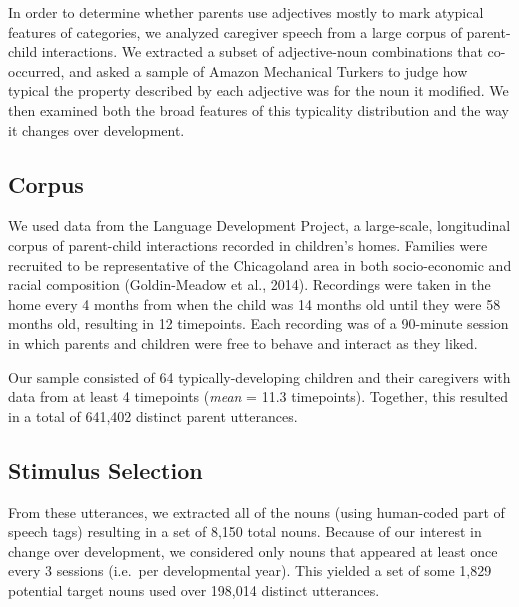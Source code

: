 \documentclass[10pt, letterpaper]{article}
\begin{document}
In order to determine whether parents use adjectives mostly to mark
atypical features of categories, we analyzed caregiver speech from a
large corpus of parent-child interactions. We extracted a subset of
adjective-noun combinations that co-occurred, and asked a sample of
Amazon Mechanical Turkers to judge how typical the property described by
each adjective was for the noun it modified. We then examined both the
broad features of this typicality distribution and the way it changes
over development.

\hypertarget{corpus}{%
\subsection{Corpus}\label{corpus}}

We used data from the Language Development Project, a large-scale,
longitudinal corpus of parent-child interactions recorded in children's
homes. Families were recruited to be representative of the Chicagoland
area in both socio-economic and racial composition (Goldin-Meadow et
al., 2014). Recordings were taken in the home every 4 months from when
the child was 14 months old until they were 58 months old, resulting in
12 timepoints. Each recording was of a 90-minute session in which
parents and children were free to behave and interact as they liked.

Our sample consisted of 64 typically-developing children and their
caregivers with data from at least 4 timepoints (\emph{mean} = 11.3
timepoints). Together, this resulted in a total of 641,402 distinct
parent utterances.

\hypertarget{stimulus-selection}{%
\subsection{Stimulus Selection}\label{stimulus-selection}}

From these utterances, we extracted all of the nouns (using human-coded
part of speech tags) resulting in a set of 8,150 total nouns. Because of
our interest in change over development, we considered only nouns that
appeared at least once every 3 sessions (i.e.~per developmental year).
This yielded a set of some 1,829 potential target nouns used over
198,014 distinct utterances.
\end{document}
